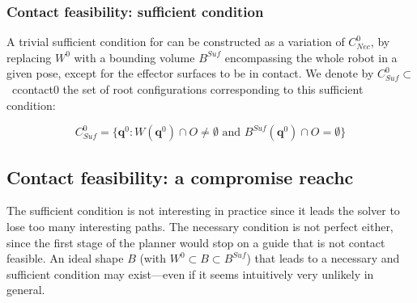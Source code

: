 
\subsubsection*{Contact feasibility: sufficient condition}
A trivial sufficient condition for  can be constructed as a variation of $C^0_{Nec}$, by replacing $W^0$ with a bounding volume $B^{Suf}$ encompassing the whole robot in a given pose, except for the effector surfaces to be in contact. We denote by \mbox{$C_{Suf}^0 \subset $ \gls{ccontact0}} the set of root configurations corresponding to this sufficient condition:

\begin{equation}
C_{Suf}^0 = \{ \mathbf{q}^0 : W(\mathbf{q}^{0}) \cap O \neq \emptyset \text{ and } B^{Suf}(\mathbf{q}^{0}) \cap O = \emptyset \} %
\end{equation}


\subsection{Contact feasibility: a compromise \gls{reachc}}
The sufficient condition is not interesting in practice since it leads the solver to lose too many interesting paths. The necessary condition is not perfect either, since the first stage of the planner would stop on a guide that is not \gls{contact feasible}. 
An ideal shape $B$ (with $W^0 \subset B \subset B^{Suf}$) that leads to a necessary and sufficient condition may exist---even if it seems intuitively very unlikely in general. 


